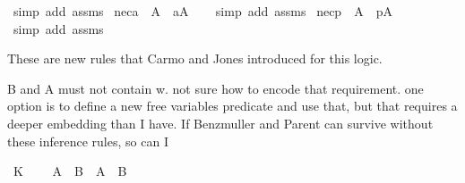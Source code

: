 \begin{isabellebody}
%
\isatagproof
{}\isamarkupfalse%
\ {\isacharparenleft}simp\ add{\isacharcolon}\ assms{\isacharparenright}%
\endisatagproof
{\isafoldproof}%
%
\isadelimproof
\isanewline
%
\endisadelimproof
\isanewline
{}\isamarkupfalse%
\ nec{\isacharunderscore}a{\isacharcolon}\ \ {\isachardoublequoteopen}{\isasymTurnstile}A{\isachardoublequoteclose}\ \ {\isachardoublequoteopen}{\isasymTurnstile}{\isacharparenleft}{\isasymbox}\isactrlsub aA{\isacharparenright}{\isachardoublequoteclose}\isanewline
%
\isadelimproof
\ \ %
\endisadelimproof
%
\isatagproof
{}\isamarkupfalse%
\ {\isacharparenleft}simp\ add{\isacharcolon}\ assms{\isacharparenright}%
\endisatagproof
{\isafoldproof}%
%
\isadelimproof
\isanewline
%
\endisadelimproof
{}\isamarkupfalse%
\ nec{\isacharunderscore}p{\isacharcolon}\ \ {\isachardoublequoteopen}{\isasymTurnstile}A{\isachardoublequoteclose}\ \ {\isachardoublequoteopen}{\isasymTurnstile}{\isacharparenleft}{\isasymbox}\isactrlsub pA{\isacharparenright}{\isachardoublequoteclose}\isanewline
%
\isadelimproof
\ \ %
\endisadelimproof
%
\isatagproof
{}\isamarkupfalse%
\ {\isacharparenleft}simp\ add{\isacharcolon}\ assms{\isacharparenright}%
\endisatagproof
{\isafoldproof}%
%
\isadelimproof
%
\endisadelimproof
%
\isadelimdocument
%
\endisadelimdocument
%
\isatagdocument
%
\isamarkuptrue%
%
\endisatagdocument
{\isafolddocument}%
%
\isadelimdocument
%
\endisadelimdocument
%
\begin{isamarkuptext}%
These are new rules that Carmo and Jones introduced for this logic.%
\end{isamarkuptext}\isamarkuptrue%
%
\begin{isamarkuptext}%
B and A must not contain w. not sure how to encode that requirement.
one option is to define a new free variables predicate and use that, but that requires a deeper embedding than I have.
If Benzmuller and Parent can survive without these inference rules, so can I%
\end{isamarkuptext}\isamarkuptrue%
%
\isadelimdocument
%
\endisadelimdocument
%
\isatagdocument
%
\isamarkuptrue%
%
\isamarkuptrue%
%
%
\endisatagdocument
{\isafolddocument}%
%
\isadelimdocument
%
\endisadelimdocument
\isanewline
{}\isamarkupfalse%
\ K{\isacharcolon}\isanewline
\ \ \ {\isachardoublequoteopen}{\isasymTurnstile}\ {\isacharparenleft}{\isacharparenleft}{\isasymbox}{\isacharparenleft}A\ \isactrlbold {\isasymrightarrow}\ B{\isacharparenright}{\isacharparenright}\ \isactrlbold {\isasymrightarrow}\ {\isacharparenleft}{\isacharparenleft}{\isasymbox}A{\isacharparenright}\ \isactrlbold {\isasymrightarrow}\ {\isacharparenleft}{\isasymbox}B{\isacharparenright}{\isacharparenright}{\isacharparenright}{\isachardoublequoteclose}\isanewline

\end{isabellebody}
